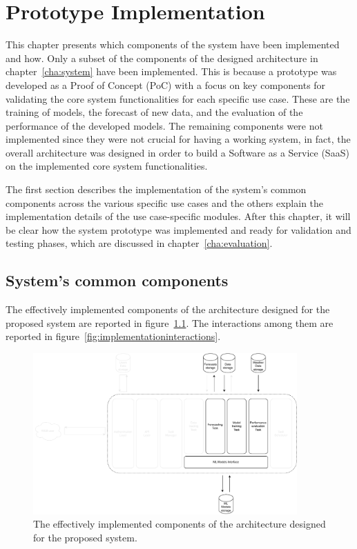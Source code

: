 \chapter{Prototype Implementation}
\label{cha:implementation}
\vspace{0.4 cm}

This chapter presents which components of the system have been implemented and how.
Only a subset of the components of the designed architecture in chapter~\ref{cha:system} have been implemented.
This is because a prototype was developed as a Proof of Concept (PoC) with a focus on key components for validating the core system functionalities for each specific use case.
These are the training of models, the forecast of new data, and the evaluation of the performance of the developed models.
The remaining components were not implemented since they were not crucial for having a working system, in fact, the overall architecture was designed in order to build a Software as a Service (SaaS) on the implemented core system functionalities.

The first section describes the implementation of the system's common components across the various specific use cases and the others explain the implementation details of the use case-specific modules.
After this chapter, it will be clear how the system prototype was implemented and ready for validation and testing phases, which are discussed in chapter~\ref{cha:evaluation}.


\section{System's common components}
\label{sec:componentsimpl}
\vspace{0.2 cm}

The effectively implemented components of the architecture designed for the proposed system are reported in figure~\ref{fig:implementationcomponents}.
The interactions among them are reported in figure~\ref{fig:implementationinteractions}.

\begin{figure}[H]
\centering
\includegraphics[width=0.9\textwidth]{images/implementation_components}
\caption{The effectively implemented components of the architecture designed for the proposed system.}
\label{fig:implementationcomponents}
\end{figure}

